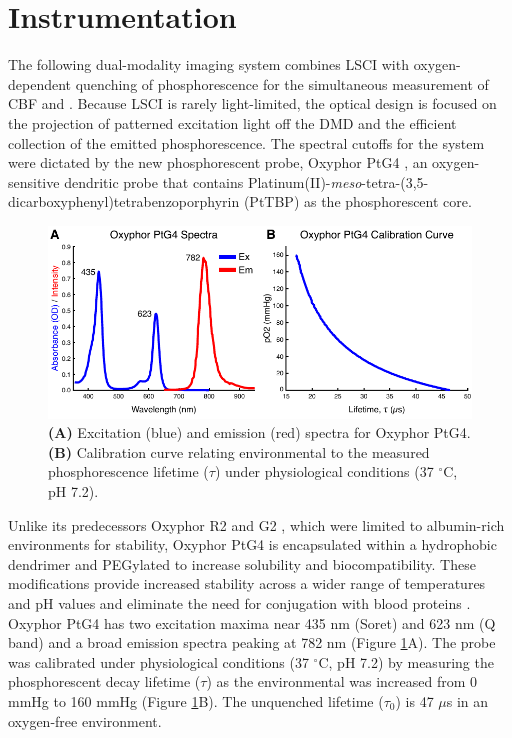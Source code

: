 \section{Instrumentation}

The following dual-modality imaging system combines LSCI with oxygen-dependent quenching of phosphorescence for the simultaneous measurement of CBF and . Because LSCI is rarely light-limited, the optical design is focused on the projection of patterned excitation light off the DMD and the efficient collection of the emitted phosphorescence. The spectral cutoffs for the system were dictated by the new phosphorescent probe, Oxyphor PtG4 \cite{Esipova:2011hi}, an oxygen-sensitive dendritic probe that contains Platinum(II)-\textit{meso}-tetra-(3,5-dicarboxyphenyl)tetrabenzoporphyrin (PtTBP) as the phosphorescent core.

\begin{figure}
    \includegraphics{figures/chapter_2/oxyphorptg4.pdf}
    \caption {
        \label{fig:oxyphor_ptg4}
        \textbf{(A)} Excitation (blue) and emission (red) spectra for Oxyphor PtG4. \textbf{(B)} Calibration curve relating environmental  to the measured phosphorescence lifetime ($\tau$) under physiological conditions (37 $^\circ$C, pH 7.2).
    }
\end{figure}

Unlike its predecessors Oxyphor R2 and G2 \cite{Dunphy:2002tz}, which were limited to albumin-rich environments for stability, Oxyphor PtG4 is encapsulated within a hydrophobic dendrimer and PEGylated to increase solubility and biocompatibility. These modifications provide increased stability across a wider range of temperatures and pH values and eliminate the need for conjugation with blood proteins \cite{Esipova:2011hi}. Oxyphor PtG4 has two excitation maxima near 435 nm (Soret) and 623 nm (Q band) and a broad emission spectra peaking at 782 nm (Figure \ref{fig:oxyphor_ptg4}A). The probe was calibrated under physiological conditions (37 $^\circ$C, pH 7.2) by measuring the phosphorescent decay lifetime ($\tau$) as the environmental  was increased from 0 mmHg to 160 mmHg (Figure \ref{fig:oxyphor_ptg4}B). The unquenched lifetime ($\tau_0$) is 47 $\mu$s in an oxygen-free environment.

